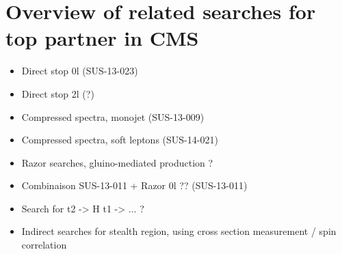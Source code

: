    \section{Overview of related searches for top partner in CMS \label{sec:analysis_overviewStopSearches}}

        \begin{itemize}
            \item Direct stop 0l (SUS-13-023)
            \item Direct stop 2l (?)
            \item Compressed spectra, monojet (SUS-13-009)


            \item Compressed spectra, soft leptons (SUS-14-021)
            \item Razor searches, gluino-mediated production ?
            \item Combinaison SUS-13-011 + Razor 0l ?? (SUS-13-011)
            \item Search for t2 -> H t1 -> ... ?
            \item Indirect searches for stealth region, using cross section measurement / spin correlation
        \end{itemize}


        \loremipsum




